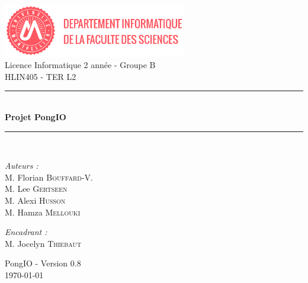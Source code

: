 \documentclass[a4paper,12pt,oneside]{book}
\begin{document}

\begin{titlepage}
\begin{center}

\includegraphics[width=0.6\textwidth]{dpt-info-fds.png}\\[1cm]

{\large Licence Informatique 2 année - Groupe B}\\[0.5cm]

{\large HLIN405 - TER L2}\\[0.5cm]

\rule{\linewidth}{0.5mm} \\[0.4cm]
{ \huge \bfseries Projet PongIO \\[0.4cm] }
\rule{\linewidth}{0.5mm} \\[1.5cm]

\noindent
\begin{minipage}{0.4\textwidth}
  \begin{flushleft} \large
    \emph{Auteurs :}\\
    M. Florian \textsc{Bouffard-V.}\\
    M. Lee \textsc{Gertseen}\\
    M. Alexi \textsc{Husson}\\
    M. Hamza \textsc{Mellouki}\\
  \end{flushleft}
\end{minipage}%
\begin{minipage}{0.4\textwidth}
  \begin{flushright} \large
    \emph{Encadrant :} \\
    M. Jocelyn \textsc{Thiebaut}
  \end{flushright}
\end{minipage}

\vfill

{\large PongIO - Version 0.8\\ \today}

\end{center}
\end{titlepage}


\renewcommand{\contentsname}{Table des matières}
\tableofcontents{}
\end{document}
